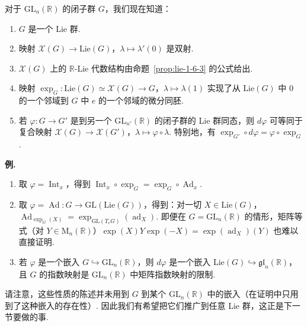 \begin{numpara}[小结]\label{np:lie-1-6-6}
对于 $\mathrm{GL}_n(\mathbb R)$ 的闭子群 $G$，我们现在知道：
\begin{enumerate}[label=\roman*)]
\item $G$ 是一个 Lie 群.
\item 映射 $\mathscr X(G)\longrightarrow\mathrm{Lie}(G)$，$\lambda\mapsto\lambda'(0)$ 是双射.
\item $\mathscr X(G)$ 上的 $\mathbb R$-Lie 代数结构由命题~\ref{prop:lie-1-6-3} 的公式给出.
\item 映射 $\exp_G:\mathrm{Lie}(G)\simeq\mathscr X(G)\longrightarrow G$，$\lambda\mapsto\lambda(1)$ 实现了从 $\mathrm{Lie}(G)$ 中 $0$ 的一个邻域到 $G$ 中 $e$ 的一个邻域的微分同胚.
\item 若 $\varphi:G\longrightarrow G'$ 是到另一个 $\mathrm{GL}_{n'}(\mathbb R)$ 的闭子群的 Lie 群同态，则 $d\varphi$ 可等同于复合映射 $\mathscr X(G)\longrightarrow\mathscr X(G')$，$\lambda\mapsto\varphi\circ\lambda$. 特别地，有 $\exp_{G'}\circ d\varphi=\varphi\circ\exp_G$.
\end{enumerate}
\noindent\textbf{例.}
\begin{enumerate}[label=\roman*)]
\item 取 $\varphi=\operatorname{Int}_x$，得到 $\operatorname{Int}_x\circ\exp_G=\exp_G\circ\operatorname{Ad}_x$.
\item 取 $\varphi=\operatorname{Ad}:G\longrightarrow\mathrm{GL}(\mathrm{Lie}(G))$，得到：对一切 $X\in\mathrm{Lie}(G)$，$\operatorname{Ad}_{\exp_G(X)}=\exp_{\mathrm{GL}(T_eG)}(\operatorname{ad}_X)$. 即便在 $G=\mathrm{GL}_n(\mathbb R)$ 的情形，矩阵等式（对 $Y\in\mathrm{M}_n(\mathbb R)$）$\exp(X)Y\exp(-X)=\exp(\operatorname{ad}_X)(Y)$ 也难以直接证明.
\item 若 $\varphi$ 是一个嵌入 $G\hookrightarrow\mathrm{GL}_n(\mathbb R)$，则 $d\varphi$ 是一个嵌入 $\mathrm{Lie}(G)\hookrightarrow\mathfrak{gl}_n(\mathbb R)$，且 $G$ 的指数映射是 $\mathrm{GL}_n(\mathbb R)$ 中矩阵指数映射的限制.
\end{enumerate}
\end{numpara}
请注意，这些性质的陈述并未用到 $G$ 到某个 $\mathrm{GL}_n(\mathbb R)$ 中的嵌入（在证明中只用到了这种嵌入的存在性）. 因此我们有希望把它们推广到任意 Lie 群，这正是下一节要做的事.

